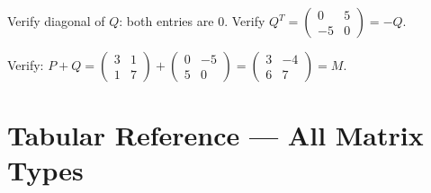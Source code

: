 \documentclass[12pt,a4paper]{article}
\begin{document}
Verify diagonal of $Q$: both entries are $0$. \checkmark \quad Verify $Q^T = \begin{pmatrix}0&5\\-5&0\end{pmatrix} = -Q$. \checkmark

Verify: $P + Q = \begin{pmatrix}3&1\\1&7\end{pmatrix} + \begin{pmatrix}0&-5\\5&0\end{pmatrix} = \begin{pmatrix}3&-4\\6&7\end{pmatrix} = M$. \checkmark

\section{Tabular Reference --- All Matrix Types}
\end{document}

